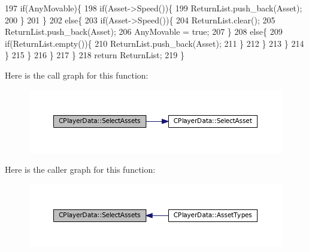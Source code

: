 \begin{DoxyCode}
197                     \textcolor{keywordflow}{if}(AnyMovable)\{
198                         \textcolor{keywordflow}{if}(Asset->Speed())\{
199                             ReturnList.push\_back(Asset);
200                         \}
201                     \}
202                     \textcolor{keywordflow}{else}\{
203                         \textcolor{keywordflow}{if}(Asset->Speed())\{
204                             ReturnList.clear();
205                             ReturnList.push\_back(Asset);
206                             AnyMovable = \textcolor{keyword}{true};
207                         \}
208                         \textcolor{keywordflow}{else}\{
209                             \textcolor{keywordflow}{if}(ReturnList.empty())\{
210                                 ReturnList.push\_back(Asset);
211                             \}
212                         \}
213                     \}
214                 \}
215             \}
216         \}
217     \}
218     \textcolor{keywordflow}{return} ReturnList;
219 \}
\end{DoxyCode}
Here is the call graph for this function\+:
\nopagebreak
\begin{figure}[H]
\begin{center}
\leavevmode
\includegraphics[width=350pt]{classCPlayerData_afb3303a53687383e4101d4de37391d84_cgraph}
\end{center}
\end{figure}
Here is the caller graph for this function\+:
\nopagebreak
\begin{figure}[H]
\begin{center}
\leavevmode
\includegraphics[width=350pt]{classCPlayerData_afb3303a53687383e4101d4de37391d84_icgraph}
\end{center}
\end{figure}
\hypertarget{classCPlayerData_a3ac1393306e8a3f7c95d13ca01e429a7}{}\label{classCPlayerData_a3ac1393306e8a3f7c95d13ca01e429a7} 
